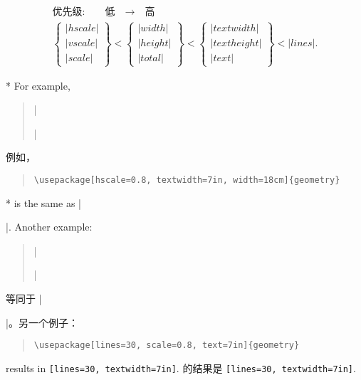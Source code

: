 \begin{paracol}{2}
\switchcolumn
 \[\begin{array}{c}
 \textrm{优先级:}\qquad\textrm{低}\quad
    \longrightarrow\quad\textrm{高}\\[1em]
 \left\{\begin{array}{l}|hscale|\\|vscale|\\|scale|
        \end{array}\right\} <
 \left\{\begin{array}{l}|width|\\|height|\\|total|
        \end{array}\right\} <
 \left\{\begin{array}{l}|textwidth|\\|textheight|
         \\|text|\end{array}\right\} < |lines|.
 \end{array}\]


 \switchcolumn[0]*
 For example, 
 \begin{quote}
  |\usepackage[hscale=0.8, textwidth=7in, width=18cm]{geometry}|
 \end{quote}
\switchcolumn
例如，
\begin{quote}
\begin{verbatim}
\usepackage[hscale=0.8, textwidth=7in, width=18cm]{geometry}
\end{verbatim}    
\end{quote}

\switchcolumn[0]*
is the same as |\usepackage[textwidth=7in]{geometry}|. Another example:
\begin{quote}
|\usepackage[lines=30, scale=0.8, text=7in]{geometry}|
\end{quote}
\switchcolumn
等同于 |\usepackage[textwidth=7in]{geometry}|。另一个例子：
\begin{quote}
\begin{verbatim}
\usepackage[lines=30, scale=0.8, text=7in]{geometry}
\end{verbatim}    
\end{quote}
\switchcolumn[0]
results in \texttt{[lines=30, textwidth=7in]}.
\switchcolumn
的结果是 \texttt{[lines=30, textwidth=7in]}.
\end{paracol}

